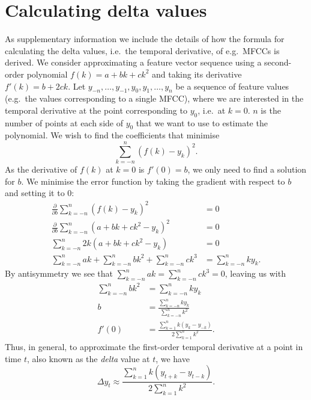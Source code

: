 \appendix

\chapter{Calculating delta values}
\label{app:delta}

As supplementary information we include the details of how the formula for calculating the delta values, i.e.\ the temporal derivative, of e.g.\ MFCCs is derived.
We consider approximating a feature vector sequence using a second-order polynomial $f(k)=a + bk + ck^2$ and taking its derivative $f'(k)=b + 2ck$.
Let $y_{-n}, \dots, y_{-1}, y_0, y_1, \dots, y_n$ be a sequence of feature values (e.g.\ the values corresponding to a single MFCC), where we are interested in the temporal derivative at the point corresponding to $y_0$, i.e.\ at $k=0$.
$n$ is the number of points at each side of $y_0$ that we want to use to estimate the polynomial.
We wish to find the coefficients that minimise
\begin{equation}
\sum_{k=-n}^n (f(k) - y_k)^2.
\end{equation}
As the derivative of $f(k)$ at $k=0$ is $f'(0) = b$, we only need to find a solution for $b$.
We minimise the error function by taking the gradient with respect to $b$ and setting it to $0$:
\begin{align}
  \frac{\partial}{\partial b} \sum_{k=-n}^n (f(k) - y_k)^2 &= 0 \\
  \frac{\partial}{\partial b} \sum_{k=-n}^n (a + bk + ck^2 - y_k)^2 &= 0 \\
  \sum_{k=-n}^n 2k(a + bk + ck^2 - y_k) &= 0 \\
  \sum_{k=-n}^n ak + \sum_{k=-n}^n bk^2 + \sum_{k=-n}^n ck^3 &= \sum_{k=-n}^n ky_k.
\end{align}
By antisymmetry we see that $\sum_{k=-n}^n ak = \sum_{k=-n}^n ck^3 = 0$, leaving us with
\begin{align}
  \sum_{k=-n}^n bk^2 &= \sum_{k=-n}^n ky_k \\
  b &= \frac{\sum_{k=-n}^n ky_k}{\sum_{k=-n}^n k^2} \\
  f'(0) &= \frac{\sum_{k=1}^n k(y_k - y_{-k})}{2\sum_{k=1}^n k^2}.
\end{align}
Thus, in general, to approximate the first-order temporal derivative at a point in time $t$, also known as the \emph{delta} value at $t$, we have
\begin{equation}
\Delta y_t \approx \frac{\sum_{k=1}^n k(y_{t+k} - y_{t-k})}{2 \sum_{k=1}^n k^2}.
\end{equation}
